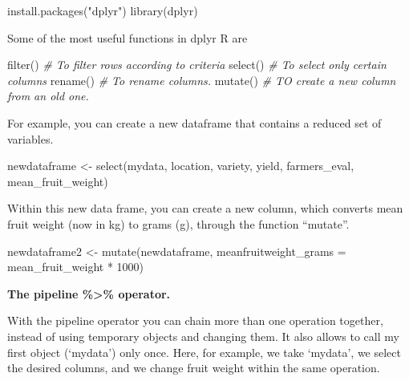 \documentclass[
]{book}
\newenvironment{Shaded}{\begin{snugshade}}{\end{snugshade}}
\newcommand{\AttributeTok}[1]{\textcolor[rgb]{0.77,0.63,0.00}{#1}}
\newcommand{\CommentTok}[1]{\textcolor[rgb]{0.56,0.35,0.01}{\textit{#1}}}
\newcommand{\DecValTok}[1]{\textcolor[rgb]{0.00,0.00,0.81}{#1}}
\newcommand{\FunctionTok}[1]{\textcolor[rgb]{0.00,0.00,0.00}{#1}}
\newcommand{\NormalTok}[1]{#1}
\newcommand{\OtherTok}[1]{\textcolor[rgb]{0.56,0.35,0.01}{#1}}
\newcommand{\SpecialCharTok}[1]{\textcolor[rgb]{0.00,0.00,0.00}{#1}}
\newcommand{\StringTok}[1]{\textcolor[rgb]{0.31,0.60,0.02}{#1}}
\begin{document}
\begin{Shaded}
\begin{Highlighting}[]
\FunctionTok{install.packages}\NormalTok{(}\StringTok{"dplyr"}\NormalTok{)}
\FunctionTok{library}\NormalTok{(dplyr)}
\end{Highlighting}
\end{Shaded}

Some of the most useful functions in dplyr R are

\begin{Shaded}
\begin{Highlighting}[]
\FunctionTok{filter}\NormalTok{() }\CommentTok{\# To filter rows according to criteria}
\FunctionTok{select}\NormalTok{() }\CommentTok{\# To select only certain columns}
\FunctionTok{rename}\NormalTok{() }\CommentTok{\# To rename columns. }
\FunctionTok{mutate}\NormalTok{() }\CommentTok{\# TO create a new column from an old one.}
\end{Highlighting}
\end{Shaded}

For example, you can create a new dataframe that contains a reduced set of variables.

\begin{Shaded}
\begin{Highlighting}[]
\NormalTok{newdataframe }\OtherTok{\textless{}{-}} \FunctionTok{select}\NormalTok{(mydata, location, variety, yield, farmers\_eval, mean\_fruit\_weight)}
\end{Highlighting}
\end{Shaded}

Within this new data frame, you can create a new column, which converts mean fruit weight (now in kg) to grams (g), through the function ``mutate''.

\begin{Shaded}
\begin{Highlighting}[]
\NormalTok{newdataframe2 }\OtherTok{\textless{}{-}} \FunctionTok{mutate}\NormalTok{(newdataframe, }\AttributeTok{meanfruitweight\_grams =}\NormalTok{ mean\_fruit\_weight }\SpecialCharTok{*} \DecValTok{1000}\NormalTok{)}
\end{Highlighting}
\end{Shaded}

\textbf{The pipeline \%\textgreater\% operator.}

With the pipeline operator you can chain more than one operation together, instead of using temporary objects and changing them. It also allows to call my first object (`mydata') only once. Here, for example, we take `mydata', we select the desired columns, and we change fruit weight within the same operation.
\end{document}
